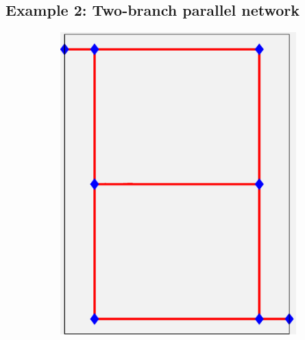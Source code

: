 \documentclass[11pt,letterpaper]{article}
\begin{document}
\subsection{Example 2: Two-branch parallel network}
\label{subsec_parallelTwo_example}
\begin{figure}[!h]
\centering
\begin{subfigure}{0.28\textwidth}
\includegraphics[width=\linewidth]{parallelTwoRef.eps}
\caption{}
\end{subfigure}
\begin{subfigure}{0.28\textwidth}

\end{subfigure}
\end{figure}
\end{document}
